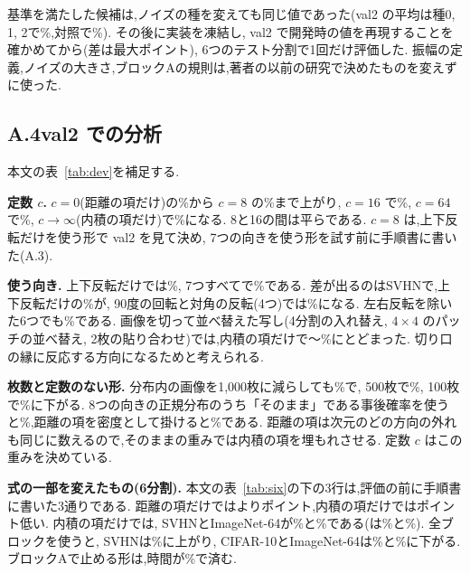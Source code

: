 基準を満たした候補は,ノイズの種を変えても同じ値であった(val2 の平均は種0, 1, 2で\olDevSeeds\%,対照で\olDevSeedsEq\%). その後に実装を凍結し, val2 で開発時の値を再現することを確かめてから(差は最大\olDevDiff{}ポイント), 6つのテスト分割で1回だけ評価した. 振幅の定義,ノイズの大きさ,ブロックAの規則は,著者の以前の研究で決めたものを変えずに使った.

\subsection*{A.4\quad val2 での分析}
本文の表~\ref{tab:dev}を補足する.

\textbf{定数 $c$.} $c=0$(距離の項だけ)の\olDevCzero\%から $c=8$ の\olDevCeight\%まで上がり, $c=16$ で\olDevCsixteen\%, $c=64$ で\olDevCsixtyfour\%, $c\to\infty$(内積の項だけ)で\olDevCinf\%になる. 8と16の間は平らである. $c=8$ は,上下反転だけを使う形で val2 を見て決め, 7つの向きを使う形を試す前に手順書に書いた(A.3).

\textbf{使う向き.} 上下反転だけでは\olDevOv\%, 7つすべてで\olDevCeight\%である. 差が出るのはSVHNで,上下反転だけの\olDevSVHNOv\%が, 90度の回転と対角の反転(4つ)では\olDevSVHNOquarter\%になる. 左右反転を除いた6つでも\olDevOnomirror\%である. 画像を切って並べ替えた写し(4分割の入れ替え, $4{\times}4$ のパッチの並べ替え, 2枚の貼り合わせ)では,内積の項だけで\olDevCutMin{}〜\olDevCutMax\%にとどまった. 切り口の縁に反応する方向になるためと考えられる.

\textbf{枚数と定数のない形.} 分布内の画像を1{,}000枚に減らしても\olDevNthousand\%で, 500枚で\olDevNfivehundred\%, 100枚で\olDevNhundred\%に下がる. 8つの向きの正規分布のうち「そのまま」である事後確率を使うと\olDevPk\%,距離の項を密度として掛けると\olDevPkd\%である. 距離の項は\olNBlkCten{}次元のどの方向の外れも同じに数えるので,そのままの重みでは内積の項を埋もれさせる. 定数 $c$ はこの重みを決めている.

\textbf{式の一部を変えたもの(6分割).} 本文の表~\ref{tab:six}の下の3行は,評価の前に手順書に書いた3通りである. 距離の項だけでは\Ours{}より\olSixTGap{}ポイント,内積の項だけでは\olSixLGap{}ポイント低い. 内積の項だけでは, SVHNとImageNet-64が\olSixLSVHN\%と\olSixLIN\%である(\Ours{}は\olSixSVHN\%と\olSixIN\%). 全ブロックを使うと, SVHNは\olSixAllSVHN\%に上がり, CIFAR-10とImageNet-64は\olSixAllCten\%と\olSixAllIN\%に下がる. ブロックAで止める形は,時間が\olFwdAShare\%で済む.

